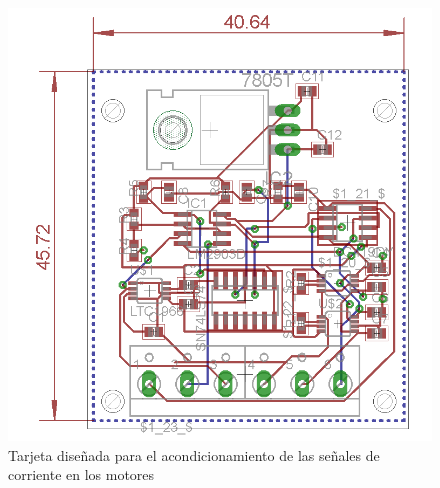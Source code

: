 %
% 









\begin{figure}
\centering
\includegraphics[scale=0.4]{FiguresP/CircuitoCorriente}
\caption{Tarjeta diseñada para el acondicionamiento de las señales de corriente en los motores}
\label{fig:TarjetaCorriente}
\end{figure}




